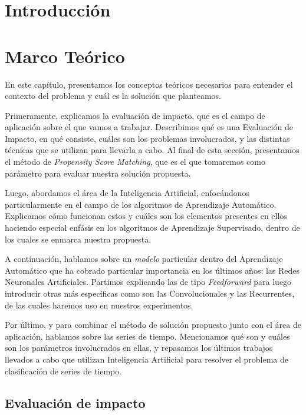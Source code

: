 \documentclass[a4paper,12pt,spanish]{book}
\begin{document}
\tableofcontents
\clearpage

\chapter{Introducción}


\chapter{Marco Teórico}
En este capítulo, presentamos los conceptos teóricos necesarios para entender el contexto
del problema y cuál es la solución que planteamos.

Primeramente, explicamos la evaluación de impacto, que es el campo de aplicación sobre el
que vamos a trabajar. Describimos qué es una Evaluación de Impacto, en qué consiste,
cuáles son los problemas involucrados, y las distintas técnicas que se utilizan para
llevarla a cabo. Al final de esta sección, presentamos el método de \textit{Propensity
Score Matching}, que es el que tomaremos como parámetro para evaluar nuestra solución
propuesta.

Luego, abordamos el área de la Inteligencia Artificial, enfocándonos particularmente
en el campo de los algoritmos de Aprendizaje Automático. Explicamos cómo funcionan estos y
cuáles son los elementos presentes en ellos haciendo especial enfásis en los algoritmos de
Aprendizaje Supervisado, dentro de los cuales se enmarca nuestra propuesta.

A continuación, hablamos sobre un \textit{modelo} particular dentro del Aprendizaje
Automático que ha cobrado particular importancia en los últimos años: las Redes Neuronales
Artificiales. Partimos explicando las de tipo \textit{Feedforward} para luego introducir
otras más específicas como son las Convolucionales y las Recurrentes, de las cuales
haremos uso en nuestros experimentos.

Por último, y para combinar el método de solución propuesto junto con el área de
aplicación, hablamos sobre las series de tiempo. Mencionamos qué son y cuáles son los
parámetros involucrados en ellas, y repasamos los últimos trabajos llevados a cabo que
utilizan Inteligencia Artificial para resolver el problema de clasificación de series de
tiempo.

\section{Evaluación de impacto}

\end{document}
